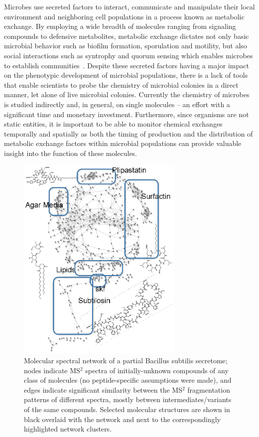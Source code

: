\documentclass[8.5pt,twoside,twocolumn]{article}
\begin{document}
Microbes use secreted factors to interact, communicate and manipulate their local environment and neighboring cell populations in a process known as metabolic exchange. By employing a wide breadth of molecules ranging from signaling compounds to defensive metabolites, metabolic exchange dictates not only basic microbial behavior such as biofilm formation, sporulation and motility, but also social interactions such as syntrophy and quorum sensing which enables microbes to establish communities~\cite{phelan11,ng09b,straight09,little08,lopez10,yim07,shank11,romero11}. Despite these secreted factors having a major impact on the phenotypic development of microbial populations, there is a lack of tools that enable scientists to probe the chemistry of microbial colonies in a direct manner, let alone of live microbial colonies. Currently the chemistry of microbes is studied indirectly and, in general, on single molecules -- an effort with a significant time and monetary investment.
%
Furthermore, since organisms are not static entities, it is important to be able to monitor chemical exchanges temporally and spatially as both the timing of production and the distribution of metabolic exchange factors within microbial populations can provide valuable insight into the function of these molecules.

\begin{figure}[htb!]
\centering
  \includegraphics[height=10cm]{figures/figMolSpecNets.eps}
  \caption{Molecular spectral network of a partial Bacillus subtilis secretome; nodes indicate MS$^2$ spectra of initially-unknown compounds of any class of molecules (no peptide-specific assumptions were made), and edges indicate significant similarity between the MS$^2$ fragmentation patterns of different spectra, mostly between intermediates/variants of the same compounds. Selected molecular structures are shown in black overlaid with the network and next to the correspondingly highlighted network clusters.}
  \label{figMolSpecNets}
\end{figure}
\end{document}
